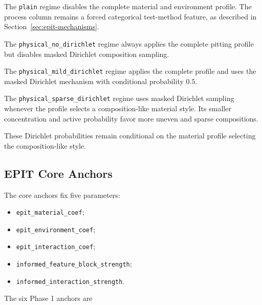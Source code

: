 \documentclass{article}
\begin{document}
The \texttt{plain} regime disables the complete material and environment profile. The process column remains a forced categorical test-method feature, as described in Section~\ref{sec:epit-mechanisms}.

The \texttt{physical\_no\_dirichlet} regime always applies the complete pitting profile but disables masked Dirichlet composition sampling.

The \texttt{physical\_mild\_dirichlet} regime applies the complete profile and uses the masked Dirichlet mechanism with conditional probability \(0.5\).

The \texttt{physical\_sparse\_dirichlet} regime uses masked Dirichlet sampling whenever the profile selects a composition-like material style. Its smaller concentration and active probability favor more uneven and sparse compositions.

These Dirichlet probabilities remain conditional on the material profile selecting the composition-like style.

\subsection{EPIT Core Anchors}

The core anchors fix five parameters:

\begin{itemize}
    \item \texttt{epit\_material\_coef};
    \item \texttt{epit\_environment\_coef};
    \item \texttt{epit\_interaction\_coef};
    \item \texttt{informed\_feature\_block\_strength};
    \item \texttt{informed\_interaction\_strength}.
\end{itemize}

The six Phase 1 anchors are

\begin{center}
\end{center}
\end{document}
